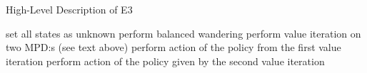 \begin{algorithm}                                        
\caption{High-Level Description of E3}          
\label{e3_high_level}                                             
\begin{algorithmic}
    \State set all states as unknown
    \Loop
            \State perform balanced wandering 
        \EndWhile
        \State perform value iteration on two MPD:s (see text above)
                \State perform action of the policy from the first value iteration
                \EndIf
            \EndFor
        \Else
                \State perform action of the policy given by the second value iteration
                \EndIf
            \EndFor
        \EndIf
    \EndLoop
\end{algorithmic}
\end{algorithm}

